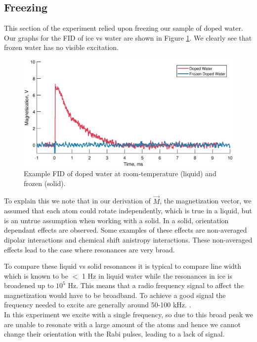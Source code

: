 \subsection{Freezing} \label{B6}

This section of the experiment relied upon freezing our sample of doped water. Our graphs for the FID of ice vs water are shown in Figure \ref{fig:B6:icewater}. We clearly see that frozen water has no visible excitation.

\begin{figure}[H]
    \centering
    \includegraphics[width=\textwidth]{figures/B6/B6_1.eps}
    \caption{Example FID of doped water at room-temperature (liquid) and frozen (solid).}
    \label{fig:B6:icewater}
\end{figure}

To explain this we note that in our derivation of $\vec{M}$, the magnetization vector, we assumed that each atom could rotate independently, which is true in a liquid, but is an untrue assumption when working with a solid. In a solid, orientation dependant effects are observed. Some examples of these effects are non-averaged dipolar interactions and chemical shift anistropy interactions. These non-averaged effects lead to the case where resonances are very broad. 

To compare these liquid vs solid resonances it is typical to compare line width which is known to be $<$ 1 Hz in liquid water while the resonances in ice is broadened up to \textapprox $10^5$ Hz. \cite{bakhmutov2015nmr} This means that a radio frequency signal to affect the magnetization would have to be broadband. To achieve a good signal the frequency needed to excite are generally around 50-100 kHz. \cite{bakhmutov2015nmr}. \\

In this experiment we excite with a single frequency, so due to this broad peak we are unable to resonate with a large amount of the atoms and hence we cannot change their orientation with the Rabi pulses, leading to a lack of signal.\\

